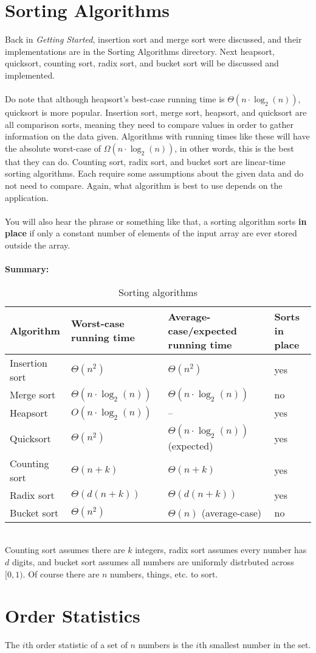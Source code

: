 \documentclass[12pt]{article}
\begin{document}
\section*{Sorting Algorithms}
Back in \textit{Getting Started}, insertion sort and merge sort were discussed, and their implementations are in the Sorting Algorithms directory. Next heapsort, quicksort, counting sort, radix sort, and bucket sort will be discussed and implemented. 
\\ \\
Do note that although heapsort's best-case running time is $\Theta{(n \cdot \log_2{(n)})}$, quicksort is more popular. Insertion sort, merge sort, heapsort, and quicksort are all comparison sorts, meaning they need to compare values in order to gather information on the data given. Algorithms with running times like these will have the absolute worst-case of $\Omega{(n \cdot \log_2{(n)})}$, in other words, this is the best that they can do. Counting sort, radix sort, and bucket sort are linear-time sorting algorithms. Each require some assumptions about the given data and do not need to compare. Again, what algorithm is best to use depends on the application.
\\ \\
You will also hear the phrase  or something like that, a sorting algorithm sorts \textbf{in place} if only a constant number of elements of the input array are ever stored outside the array.
\\ \\
\textbf{Summary:}
\begin{table}[h!]
\caption{Sorting algorithms}
\begin{tabular}{ |p{3cm}||p{3cm}|p{3cm}|p{3cm}|  }
 \hline
 \hline
 Algorithm & Worst-case running time & Average-case/expected running time & Sorts in place\\
 \hline
 Insertion sort	& $\Theta{(n^{2})}$ & $\Theta{(n^{2})}$ & yes\\
 Merge sort     & $\Theta{(n \cdot \log_2{(n)})}$ & $\Theta{(n \cdot \log_2{(n)})}$ & no\\
 Heapsort       & $O{(n \cdot \log_2{(n)})}$ & -- & yes\\
 Quicksort      & $\Theta{(n^{2})}$ & $\Theta{(n \cdot \log_2{(n)})}$ (expected) & yes\\
 Counting sort  & $\Theta{(n + k)}$ & $\Theta{(n + k)}$ & yes\\
 Radix sort     & $\Theta{(d(n+k))}$ & $\Theta{(d(n+k))}$ & yes\\
 Bucket sort    & $\Theta{(n^{2})}$ & $\Theta{(n)}$ (average-case)& no\\
  \hline
\end{tabular}
\end{table}
\\
Counting sort assumes there are $k$ integers, radix sort assumes every number has $d$ digits, and bucket sort assumes all numbers are uniformly distrbuted across $[0, 1)$. Of course there are $n$ numbers, things, etc. to sort.
 
\newpage

\section*{Order Statistics}
The $i$th order statistic of a set of $n$ numbers is the $i$th smallest number in the set.
\end{document}

